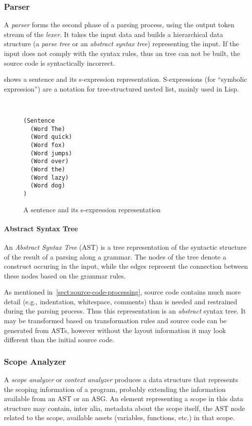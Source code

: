 \subsubsection{Parser}
A \emph{parser} forms the second phase of a parsing process, using the output token stream of the \emph{lexer}. It takes the input data and builds a hierarchical data structure (a \emph{parse tree} or an \emph{abstract syntax tree}) representing the input. If the input does not comply with the syntax rules, thus an tree can not be built, the source code is syntactically incorrect.

 shows a sentence and its s-expression representation. S-expressions (for ``symbolic expression'') are a notation for tree-structured nested list, mainly used in Lisp.

\begin{figure}[!htb]
\centering
{}\\[1em]

\begin{minipage}{3cm}
\begin{verbatim}
(Sentence
  (Word The)
  (Word quick)
  (Word fox)
  (Word jumps)
  (Word over)
  (Word the)
  (Word lazy)
  (Word dog)
)
\end{verbatim}
\end{minipage}
  \caption{A sentence and its s-expression representation}
  \label{fig:sentence-s-expression}
\end{figure}

\paragraph{Abstract Syntax Tree}
An \emph{Abstract Syntax Tree} (AST) is a tree representation of the syntactic structure of the result of a parsing along a grammar. The nodes of the tree denote a construct occuring in the input, while the edges represent the connection between these nodes based on the grammar rules.

As mentioned in~\cref{sect:source-code-processing}, source code contains much more detail (e.g., indentation, whitespace, comments) than is needed and restrained during the parsing process. Thus this representation is an \emph{abstract} syntax tree. It may be transformed based on transformation rules and source code can be generated from ASTs, however without the layout information it may look different than the initial source code.


\subsubsection{Scope Analyzer}
A \emph{scope analyzer} or \emph{context analyzer} produces a data structure that represents the scoping information of a program, probably extending the information available from an AST or an ASG. An element representing a scope in this data structure may contain, inter alia, metadata about the scope itself, the AST node related to the scope, available assets (variables, functions, etc.) in that scope.~\cite{shift-scope}

